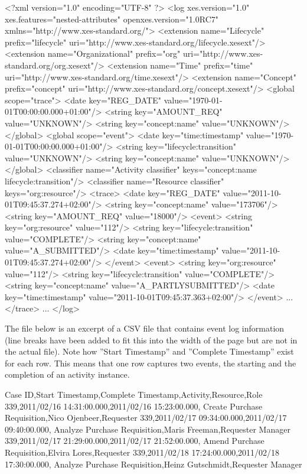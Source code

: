 \begin{xmlcode}
<?xml version="1.0" encoding="UTF-8" ?>
<log xes.version="1.0" xes.features="nested-attributes" 
    openxes.version="1.0RC7" 
    xmlns="http://www.xes-standard.org/">
  <extension name="Lifecycle" prefix="lifecycle" 
    uri="http://www.xes-standard.org/lifecycle.xesext"/>
  <extension name="Organizational" prefix="org" 
    uri="http://www.xes-standard.org/org.xesext"/>
  <extension name="Time" prefix="time" 
    uri="http://www.xes-standard.org/time.xesext"/>
  <extension name="Concept" prefix="concept" 
    uri="http://www.xes-standard.org/concept.xesext"/>
  <global scope="trace">
    <date key="REG_DATE" value="1970-01-01T00:00:00.000+01:00"/>
    <string key="AMOUNT_REQ" value="UNKNOWN"/>
    <string key="concept:name" value="UNKNOWN"/>
  </global>
  <global scope="event">
    <date key="time:timestamp" value="1970-01-01T00:00:00.000+01:00"/>
    <string key="lifecycle:transition" value="UNKNOWN"/>
    <string key="concept:name" value="UNKNOWN"/>
  </global>
  <classifier name="Activity classifier" 
     keys="concept:name lifecycle:transition"/>
  <classifier name="Resource classifier" 
     keys="org:resource"/>
  <trace>
    <date key="REG_DATE" value="2011-10-01T09:45:37.274+02:00"/>
    <string key="concept:name" value="173706"/>
    <string key="AMOUNT_REQ" value="18000"/>
    <event>
      <string key="org:resource" value="112"/>
      <string key="lifecycle:transition" value="COMPLETE"/>
      <string key="concept:name" value="A_SUBMITTED"/>
      <date key="time:timestamp" value="2011-10-01T09:45:37.274+02:00"/>
    </event>
    <event>
      <string key="org:resource" value="112"/>
      <string key="lifecycle:transition" value="COMPLETE"/>
      <string key="concept:name" value="A_PARTLYSUBMITTED"/>
      <date key="time:timestamp" value="2011-10-01T09:45:37.363+02:00"/>
    </event>
    ...
  </trace>
  ...
</log>
\end{xmlcode}

The file below is an excerpt of a CSV file that contains event log information (line breaks have been added to fit this into the width of the page but are not in the actual file). Note how ''Start Timestamp'' and ''Complete Timestamp'' exist for each row. This means that one row captures two events, the starting and the completion of an activity instance. 

\begin{textcode}
Case ID,Start Timestamp,Complete Timestamp,Activity,Resource,Role
339,2011/02/16 14:31:00.000,2011/02/16 15:23:00.000,
    Create Purchase Requisition,Nico Ojenbeer,Requester
339,2011/02/17 09:34:00.000,2011/02/17 09:40:00.000,
    Analyze Purchase Requisition,Maris Freeman,Requester Manager
339,2011/02/17 21:29:00.000,2011/02/17 21:52:00.000,
    Amend Purchase Requisition,Elvira Lores,Requester
339,2011/02/18 17:24:00.000,2011/02/18 17:30:00.000,
    Analyze Purchase Requisition,Heinz Gutschmidt,Requester Manager
\end{textcode}

